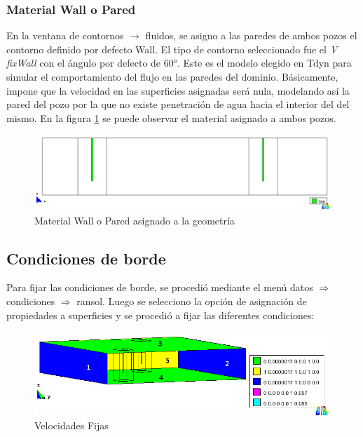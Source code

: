 \documentclass[10pt,a4paper,final]{article}
\begin{document}
\subsubsection{Material Wall o Pared}
En la ventana de contornos $\rightarrow$ fluidos, se asigno a las paredes de ambos pozos el contorno definido por defecto Wall. El tipo de contorno seleccionado fue el \emph{V fixWall} con el ángulo por defecto de $60°$. Este es el modelo elegido en Tdyn para simular el comportamiento del flujo en las paredes del dominio. Básicamente, impone que la velocidad en las superficies asignadas será nula, modelando así la pared del pozo por la que no existe penetración de agua hacia el interior del del mismo. En la figura \ref{100_condiciones_vfixwall_xz} se puede observar el material asignado a ambos pozos.
%
\begin{figure}[tbhp]
\centerline{\includegraphics[scale=0.3]{img/100m/100_condiciones_vfixwall_xz}}
\caption{Material Wall o Pared asignado a la geometría}
\label{100_condiciones_vfixwall_xz}
\end{figure}
%
\subsection{Condiciones de borde}
Para fijar las condiciones de borde, se procedió mediante el menú datos $\Rightarrow$ condiciones $\Rightarrow$ ransol. Luego se selecciono la opción de asignación de propiedades a superficies y se procedió a fijar las diferentes condiciones:

\begin{figure}[tbhp]
\centerline{\includegraphics[scale=0.4]{img/100m/100_condiciones_fijar_velocidad_perspectiva_interior_leyendas}}
\caption{Velocidades Fijas}
\label{100_condiciones_fijar_velocidad_perspectiva_interior_leyendas}
\end{figure}
\end{document}

